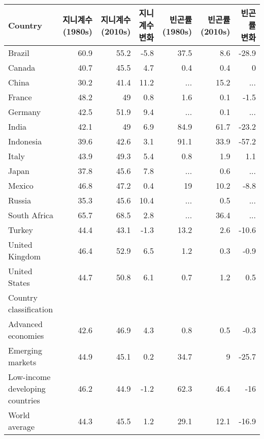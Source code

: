       \centering
        \begin{tabular}{lrrr|rrr}
        \toprule
        Country & 지니계수 (1980s) & 지니계수 (2010s) & 지니계수 변화 & 빈곤률 (1980s) & 빈곤률 (2010s) & 빈곤률 변화 \\
        \midrule
        Brazil & 60.9  & 55.2  & -5.8  & 37.5  & 8.6   & -28.9 \\
        Canada & 40.7  & 45.5  & 4.7   & 0.4   & 0.4   & 0 \\
        China & 30.2  & 41.4  & 11.2  & ... & 15.2  & ... \\
        France & 48.2  & 49    & 0.8   & 1.6   & 0.1   & -1.5 \\
        Germany & 42.5  & 51.9  & 9.4   & ... & 0.1   & ... \\
        India & 42.1  & 49    & 6.9   & 84.9  & 61.7  & -23.2 \\
        Indonesia & 39.6  & 42.6  & 3.1   & 91.1  & 33.9  & -57.2 \\
        Italy & 43.9  & 49.3  & 5.4   & 0.8   & 1.9   & 1.1 \\
        Japan & 37.8  & 45.6  & 7.8   & ... & 0.6   & ... \\
        Mexico & 46.8  & 47.2  & 0.4   & 19    & 10.2  & -8.8 \\
        Russia & 35.3  & 45.6  & 10.4  & ... & 0.5   & ... \\
        South Africa & 65.7  & 68.5  & 2.8   & ... & 36.4  & ... \\
        Turkey & 44.4  & 43.1  & -1.3  & 13.2  & 2.6   & -10.6 \\
        United Kingdom & 46.4  & 52.9  & 6.5   & 1.2   & 0.3   & -0.9 \\
        United States & 44.7  & 50.8  & 6.1   & 0.7   & 1.2   & 0.5 \\
        \midrule
        Country classification &       &       &       &       &       &  \\
        Advanced economies & 42.6  & 46.9  & 4.3   & 0.8   & 0.5   & -0.3 \\
        Emerging markets & 44.9  & 45.1  & 0.2   & 34.7  & 9     & -25.7 \\
        Low-income developing countries & 46.2  & 44.9  & -1.2  & 62.3  & 46.4  & -16 \\
        \midrule
        World average & 44.3  & 45.5  & 1.2   & 29.1  & 12.1  & -16.9 \\
        \bottomrule
        \end{tabular}%